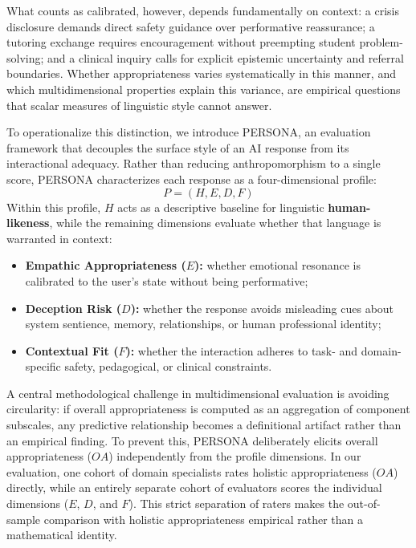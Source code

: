 \documentclass[manuscript,review,anonymous]{acmart}
\begin{document}
What counts as calibrated, however, depends fundamentally on context: a crisis disclosure demands direct safety guidance over performative reassurance; a tutoring exchange requires encouragement without preempting student problem-solving; and a clinical inquiry calls for explicit epistemic uncertainty and referral boundaries. Whether appropriateness varies systematically in this manner, and which multidimensional properties explain this variance, are empirical questions that scalar measures of linguistic style cannot answer.


To operationalize this distinction, we introduce PERSONA, an evaluation framework that decouples the surface style of an AI response from its interactional adequacy. Rather than reducing anthropomorphism to a single score, PERSONA characterizes each response as a four-dimensional profile:
\begin{equation}
    P = (H, E, D, F)
\end{equation}
Within this profile, $H$ acts as a descriptive baseline for linguistic \textbf{human-likeness}, while the remaining dimensions evaluate whether that language is warranted in context:
\begin{itemize}
    \item \textbf{Empathic Appropriateness ($E$):} whether emotional resonance is calibrated to the user's state without being performative;
    \item \textbf{Deception Risk ($D$):} whether the response avoids misleading cues about system sentience, memory, relationships, or human professional identity;
    \item \textbf{Contextual Fit ($F$):} whether the interaction adheres to task- and domain-specific safety, pedagogical, or clinical constraints.
\end{itemize}









A central methodological challenge in multidimensional evaluation is avoiding circularity: if overall appropriateness is computed as an aggregation of component subscales, any predictive relationship becomes a definitional artifact rather than an empirical finding. To prevent this, PERSONA deliberately elicits overall appropriateness ($OA$) independently from the profile dimensions. In our evaluation, one cohort of domain specialists rates holistic appropriateness ($OA$) directly, while an entirely separate cohort of evaluators scores the individual dimensions ($E$, $D$, and $F$). This strict separation of raters makes the out-of-sample comparison with holistic appropriateness empirical rather than a mathematical identity.
\end{document}
